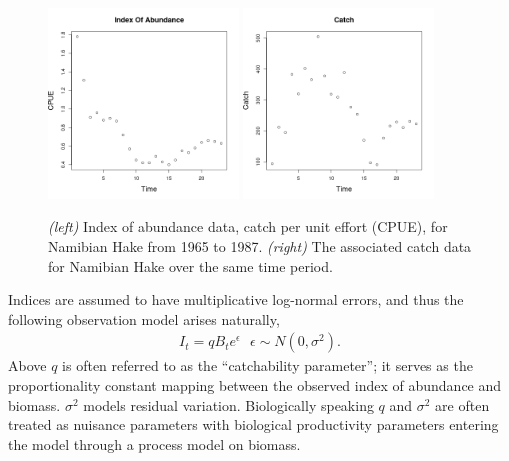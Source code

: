 \documentclass[12pt]{ucscthesis}
\begin{document}
\begin{figure}[h!]
        \includegraphics[width=0.45\textwidth]{./plots/hakeIndex.png}
        \includegraphics[width=0.45\textwidth]{./plots/hakeCatch.png}
        \caption{\label{hakeData}
        \textit{(left)} Index of abundance data, catch per unit effort (CPUE), for Namibian Hake from 1965 to 1987. %
        \textit{(right)} The associated catch data for Namibian Hake over the same time period.
        }
\end{figure}

Indices are assumed to have multiplicative log-normal errors, and thus
the following observation model arises naturally,
\begin{align}
I_t = q B_t e^\epsilon ~~~ \epsilon\sim N(0, \sigma^2).
\end{align}
%
Above $q$ is often referred to as the ``catchability parameter''; it serves as the %
proportionality constant mapping between the observed index of abundance and biomass.
$\sigma^2$ models residual variation. Biologically speaking $q$ and $\sigma^2$
are often treated as nuisance parameters with biological productivity parameters
entering the model through a process model on biomass.
\end{document}
